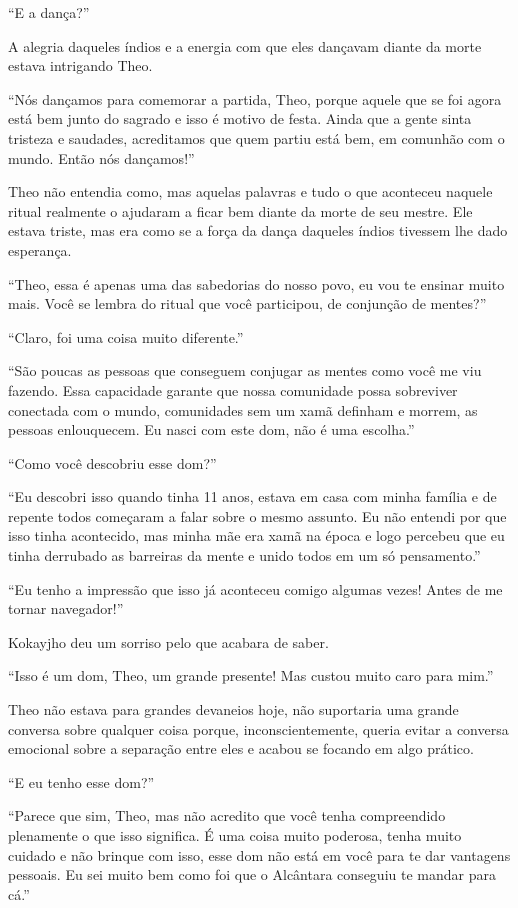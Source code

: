 ``E a dança?''

A alegria daqueles índios e a energia com que eles dançavam diante da
morte estava intrigando Theo.

``Nós dançamos para comemorar a partida, Theo, porque aquele que se foi
agora está bem junto do sagrado e isso é motivo de festa. Ainda que a
gente sinta tristeza e saudades, acreditamos que quem partiu está bem,
em comunhão com o mundo. Então nós dançamos!''

Theo não entendia como, mas aquelas palavras e tudo o que aconteceu
naquele ritual realmente o ajudaram a ficar bem diante da morte de seu
mestre. Ele estava triste, mas era como se a força da dança daqueles
índios tivessem lhe dado esperança.

``Theo, essa é apenas uma das sabedorias do nosso povo, eu vou te
ensinar muito mais. Você se lembra do ritual que você participou, de
conjunção de mentes?''

``Claro, foi uma coisa muito diferente.''

``São poucas as pessoas que conseguem conjugar as mentes como você me
viu fazendo. Essa capacidade garante que nossa comunidade possa
sobreviver conectada com o mundo, comunidades sem um xamã definham e
morrem, as pessoas enlouquecem. Eu nasci com este dom, não é uma
escolha.''

``Como você descobriu esse dom?''

``Eu descobri isso quando tinha 11 anos, estava em casa com minha
família e de repente todos começaram a falar sobre o mesmo assunto. Eu
não entendi por que isso tinha acontecido, mas minha mãe era xamã na
época e logo percebeu que eu tinha derrubado as barreiras da mente e
unido todos em um só pensamento.''

``Eu tenho a impressão que isso já aconteceu comigo algumas vezes! Antes
de me tornar navegador!''

Kokayjho deu um sorriso pelo que acabara de saber.

``Isso é um dom, Theo, um grande presente! Mas custou muito caro para
mim.''

Theo não estava para grandes devaneios hoje, não suportaria uma grande
conversa sobre qualquer coisa porque, inconscientemente, queria evitar a
conversa emocional sobre a separação entre eles e acabou se focando em
algo prático.

``E eu tenho esse dom?''

``Parece que sim, Theo, mas não acredito que você tenha compreendido
plenamente o que isso significa. É uma coisa muito poderosa, tenha muito
cuidado e não brinque com isso, esse dom não está em você para te dar
vantagens pessoais. Eu sei muito bem como foi que o Alcântara conseguiu
te mandar para cá.''

